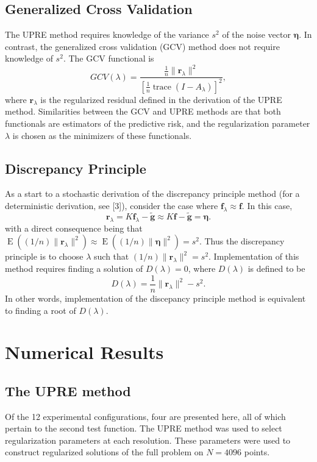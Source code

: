 \documentclass[12pt]{article}
\newcommand{\gnoise}{\widetilde{\mathbf{g}}}
\newcommand{\kmat}{K}	%
\newcommand{\fdis}{\mathbf{f}}
\newcommand{\trace}{\operatorname{trace}}	%
\newcommand{\regparam}{\lambda}
\newcommand{\freg}{\fdis_{\regparam}}	%
\newcommand{\SD}{s}	%
\newcommand{\noise}{\bm{\eta}}	%
\newcommand{\E}{\operatorname{E}}	%
\newcommand{\regres}{\mathbf{r}_{\regparam}}	%
\newcommand{\A}{A_{\regparam}}	%
\newcommand{\GCV}{GCV}	%
\newcommand{\D}{D}	%
\begin{document}
\subsection{Generalized Cross Validation}
The UPRE method requires knowledge of the variance $\SD^2$ of the noise vector $\noise$. In contrast, the generalized cross validation (GCV) method does not require knowledge of $\SD^2$. The GCV functional is
\begin{equation}
\label{Eq_GCV}
\GCV(\regparam) = \frac{\frac{1}{n}\|\regres\|^2}{\left[\frac{1}{n}\trace(I-\A)\right]^2},
\end{equation}
where $\regres$ is the regularized residual defined in the derivation of the UPRE method. Similarities between the GCV and UPRE methods are that both functionals are estimators of the predictive risk, and the regularization parameter $\regparam$ is chosen as the minimizers of these functionals.

\subsection{Discrepancy Principle}
As a start to a stochastic derivation of the discrepancy principle method (for a deterministic derivation, see [3]), consider the case where $\freg \approx \fdis$. In this case,
\[\regres = \kmat\freg - \gnoise \approx \kmat\fdis - \gnoise = \noise.\]
with a direct consequence being that $\E((1/n)\|\regres\|^2) \approx \E((1/n)\|\noise\|^2) =\SD^2$. Thus the discrepancy principle is to choose $\regparam$ such that $(1/n)\|\regres\|^2 = \SD^2$.
Implementation of this method requires finding a solution of $\D(\regparam) = 0$, where $\D(\regparam)$ is defined to be
\begin{equation}
\label{Eq_DP}
\D(\regparam) = \frac{1}{n}\|\regres\|^2 - \SD^2.
\end{equation}
In other words, implementation of the discepancy principle method is equivalent to finding a root of $\D(\regparam)$.

\section{Numerical Results}

\subsection{The UPRE method}
Of the 12 experimental configurations, four are presented here, all of which pertain to the second test function. The UPRE method was used to select regularization parameters at each resolution. These parameters were used to construct regularized solutions of the full problem on $N = 4096$ points.
\end{document}
